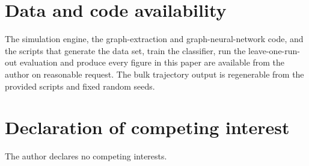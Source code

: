 \documentclass[11pt,a4paper]{article}
\begin{document}
\section*{Data and code availability}

The simulation engine, the graph-extraction and graph-neural-network
code, and the scripts that generate the data set, train the classifier,
run the leave-one-run-out evaluation and produce every figure in this
paper are available from the author on reasonable request. The bulk
trajectory output is regenerable from the provided scripts and fixed
random seeds.

\section*{Declaration of competing interest}

The author declares no competing interests.


\end{document}
